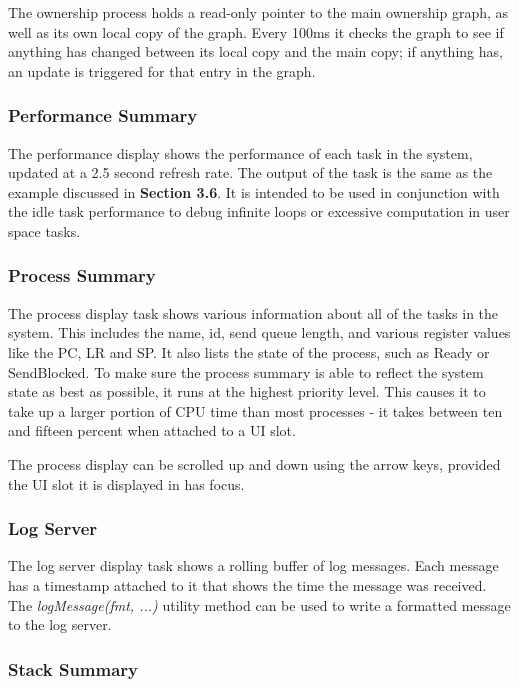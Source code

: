 \documentclass[twoside,a4paper]{refart}
\begin{document}
The ownership process holds a read-only pointer to the main ownership graph, as well as its own local copy of the graph. Every 100ms it checks the graph to see if anything has changed between its local copy and the main copy; if anything has, an update is triggered for that entry in the graph.

\subsubsection{Performance Summary}

The performance display shows the performance of each task in the system, updated at a 2.5 second refresh rate. The output of the task is the same as the example discussed in \textbf{Section 3.6}. It is intended to be used in conjunction with the idle task performance to debug infinite loops or excessive computation in user space tasks.

\subsubsection{Process Summary}

The process display task shows various information about all of the tasks in the system. This includes the name, id, send queue length, and various register values like the PC, LR and SP. It also lists the state of the process, such as Ready or SendBlocked. To make sure the process summary is able to reflect the system state as best as possible, it runs at the highest priority level. This causes it to take up a larger portion of CPU time than most processes - it takes between ten and fifteen percent when attached to a UI slot.

The process display can be scrolled up and down using the arrow keys, provided the UI slot it is displayed in has focus.

\subsubsection{Log Server}

The log server display task shows a rolling buffer of log messages. Each message has a timestamp attached to it that shows the time the message was received. The \textit{logMessage(fmt, ...)} utility method can be used to write a formatted message to the log server.

\subsubsection{Stack Summary}
\end{document}
